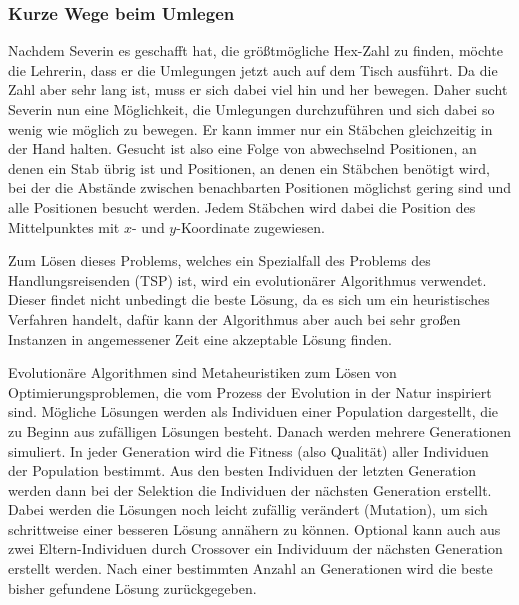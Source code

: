 \documentclass[a4paper,10pt,ngerman]{scrartcl}
\begin{document}
\subsubsection{Kurze Wege beim Umlegen}
Nachdem Severin es geschafft hat, die größtmögliche Hex-Zahl zu finden, möchte die Lehrerin, dass er die Umlegungen jetzt auch auf dem Tisch ausführt. Da die Zahl aber sehr lang ist, muss er sich dabei viel hin und her bewegen. Daher sucht Severin nun eine Möglichkeit, die Umlegungen durchzuführen und sich dabei so wenig wie möglich zu bewegen. 
Er kann immer nur ein Stäbchen gleichzeitig in der Hand halten.
Gesucht ist also eine Folge von abwechselnd Positionen, an denen ein Stab übrig ist und Positionen, an denen ein Stäbchen benötigt wird, bei der die Abstände zwischen benachbarten Positionen möglichst gering sind und alle Positionen besucht werden.
Jedem Stäbchen wird dabei die Position des Mittelpunktes mit $x$- und $y$-Koordinate zugewiesen. 

Zum Lösen dieses Problems, welches ein Spezialfall des Problems des Handlungsreisenden (TSP) ist, wird ein evolutionärer Algorithmus verwendet. 
Dieser findet nicht unbedingt die beste Lösung, da es sich um ein heuristisches Verfahren handelt, dafür kann der Algorithmus aber auch bei sehr großen Instanzen in angemessener Zeit eine akzeptable Lösung finden. 

Evolutionäre Algorithmen sind Metaheuristiken zum Lösen von Optimierungsproblemen, die vom Prozess der Evolution in der Natur inspiriert sind. 
Mögliche Lösungen werden als Individuen einer Population dargestellt, die zu Beginn aus zufälligen Lösungen besteht. 
Danach werden mehrere Generationen simuliert. 
In jeder Generation wird die Fitness (also Qualität) aller Individuen der Population bestimmt.
Aus den besten Individuen der letzten Generation werden dann bei der Selektion die Individuen der nächsten Generation erstellt. 
Dabei werden die Lösungen noch leicht zufällig verändert (Mutation), um sich schrittweise einer besseren Lösung annähern zu können.
Optional kann auch aus zwei Eltern-Individuen durch Crossover ein Individuum der nächsten Generation erstellt werden. 
Nach einer bestimmten Anzahl an Generationen wird die beste bisher gefundene Lösung zurückgegeben.
\end{document}

